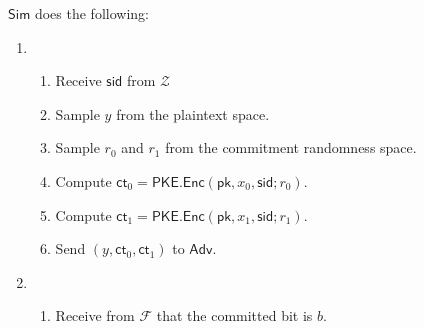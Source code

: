 \documentclass[11pt,letterpaper]{article}
\newcommand{\doclearpage}{%
  \iffull\clearpage\else\fi
}
\theoremstyle{plain} %
\theoremstyle{definition} %
\theoremstyle{remark} %
\newcommand{\Input}{x}
\newcommand{\PKE}{\mathsf{PKE}}
\newcommand{\Enc}{\mathsf{Enc}}
\newcommand{\EncKey}{\mathsf{pk}}
\newcommand{\Ct}{\mathsf{ct}}
\newcommand{\Rand}{r}
\newcommand{\CFPTPOutput}{y}
\newcommand{\Simulator}{{\mathsf{Sim}}} %
\newcommand{\Adversary}{{\mathsf{Adv}}} %
\newcommand{\Environment}{{\mathcal{Z}}} %
\newcommand{\IF}{\mathcal{F}} %
\newcommand{\sid}{\mathsf{sid}}
\newcommand{\CommittedBit}{b}
\begin{document}
\begin{minipage}{0.9\textwidth}
 $\Simulator$ does the following:
\begin{enumerate}[nolistsep]
	\item {}
	\begin{enumerate}[nolistsep]
		\item Receive $\sid$ from $\Environment$
		\item Sample $\CFPTPOutput$ from the plaintext space.
		\item Sample $\Rand_{0}$ and $\Rand_{1}$ from the commitment randomness space.
		\item Compute $\Ct_{0} = \PKE.\Enc(\EncKey,\Input_{0}, \sid; \Rand_{0})$.
		\item Compute $\Ct_{1} = \PKE.\Enc(\EncKey,\Input_{1}, \sid; \Rand_{1})$.
		\item Send $(\CFPTPOutput, \Ct_0, \Ct_1)$ to $\Adversary$.
	\end{enumerate}

	\item {}

	\begin{enumerate}[nolistsep]
		\item Receive from $\IF$ that the committed bit is $\CommittedBit$.
	\end{enumerate}

\end{enumerate}
\end{minipage}

\doclearpage
{\small{


}}
\end{document}
